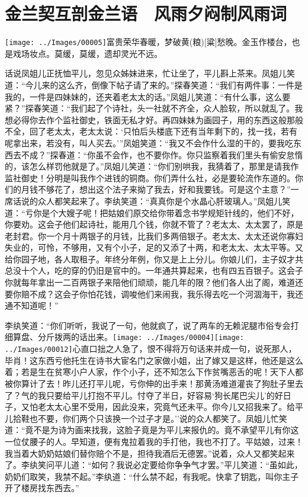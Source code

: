 

\chapter{金兰契互剖金兰语　风雨夕闷制风雨词}\label{part0049_split_000.htmlux5cux23calibre_pb_0}

{\texttt{[image: ../Images/00005]}富贵荣华春暖，梦破黄{{(粮)}}{[}粱{]}愁晚。金玉作楼台，也是戏场妆点。莫缓，莫缓，遗却灵光不远。}

话说凤姐儿正抚恤平儿，忽见众姊妹进来，忙让坐了，平儿斟上茶来。凤姐儿笑道：``今儿来的这么齐，倒像下帖子请了来的。''探春笑道：``我们有两件事：一件是我的，一件是四妹妹的，还夹着老太太的话。''凤姐儿笑道：``有什么事，这么要紧？''探春笑道：``我们起了个诗社，头一社就不齐全，众人脸软，所以就乱了。我想必得你去作个监社御史，铁面无私才好。再四妹妹为画园子，用的东西这般那般不全，回了老太太，老太太说：`只怕后头楼底下还有当年剩下的，找一找，若有呢拿出来，若没有，叫人买去。'''凤姐笑道：``我又不会作什么湿的干的，要我吃东西去不成？''探春道：``你虽不会作，也不要你作。你只监察着我们里头有偷安怠惰的，该怎么样罚他就是了。''凤姐儿笑道：``你们别哄我，我猜着了，那里是请我作监社御史！分明是叫我作个进钱的铜商。你们弄什么社，必是要轮流作东道的。你们的月钱不够花了，想出这个法子来拗了我去，好和我要钱。可是这个主意？''一席话说的众人都笑起来了。李纨笑道：``真真你是个水晶心肝玻璃人。''凤姐儿笑道：``亏你是个大嫂子呢！把姑娘们原交给你带着念书学规矩针线的，他们不好，你要劝。这会子他们起诗社，能用几个钱，你就不管了？老太太、太太罢了，原是老封君。你一个月十两银子的月钱，比我们多两倍银子。老太太、太太还说你寡妇失业的，可怜，不够用，又有个小子，足的又添了十两，和老太太、太太平等。又给你园子地，各人取租子。年终分年例，你又是上上分儿。你娘儿们，主子奴才共总没十个人，吃的穿的仍旧是官中的。一年通共算起来，也有四五百银子。这会子你就每年拿出一二百两银子来陪他们顽顽，能几年的限？他们各人出了阁，难道还要你赔不成？这会子你怕花钱，调唆他们来闹我，我乐得去吃一个河涸海干，我还通不知道呢！''

李纨笑道：``你们听听，我说了一句，他就疯了，说了两车的无赖泥腿市俗专会打细算盘、分斤拨两的话出来。{\texttt{[image: ../Images/00004]}\texttt{[image: ../Images/00012]}\footnotesize \kaishu 心直口拙之人急了，恨不得将万句话来并成一句，说死那人，毕肖！}这东西亏他托生在诗书大宦名门之家做小姐，出了嫁又是这样，他还是这么着；若是生在贫寒小户人家，作个小子，还不知怎么下作贫嘴恶舌的呢！天下人都被你算计了去！昨儿还打平儿呢，亏你伸的出手来！那黄汤难道灌丧了狗肚子里去了？气的我只要给平儿打抱不平儿。忖夺了半日，好容易`狗长尾巴尖儿'的好日子，又怕老太太心里不受用，因此没来，究竟气还未平。你今儿又招我来了。给平儿拾鞋也不要，你们两个只该换一个过子才是。''说的众人都笑了。凤姐儿忙笑道：``竟不是为诗为画来找我，这脸子竟是为平儿来报仇的。竟不承望平儿有你这一位仗腰子的人。早知道，便有鬼拉着我的手打他，我也不打了。平姑娘，过来！我当着大奶奶姑娘们替你赔个不是，担待我酒后无德罢。''说着，众人又都笑起来了。李纨笑问平儿道：``如何？我说必定要给你争争气才罢。''平儿笑道：``虽如此，奶奶们取笑，我禁不起。''李纨道：``什么禁不起，有我呢。快拿了钥匙，叫你主子开了楼房找东西去。''


